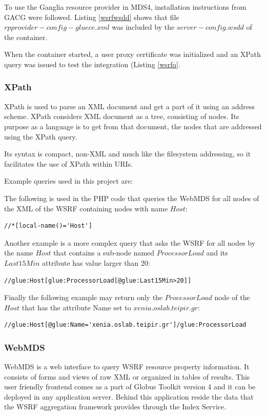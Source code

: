 To use the Ganglia resource provider in \ac{MDS}4, installation instructions from \ac{GACG} \cite{gacgrid} were followed. Listing \ref{wsrfwsdd} shows that file $rpprovider-config-gluece.xml$ was included by the $server-config.wsdd$ of the container.

When the container started, a user proxy certificate was initialized and an XPath query was issued to test the integration (Listing \ref{wsrfq}.
 
\subsubsection{XPath}

XPath is used to parse an XML document and get a part of it using an address scheme. XPath considers XML document as a tree, consisting of nodes. Its purpose as a language is to get from that document, the nodes that are addressed using the XPath query.

Its syntax is compact, non-XML and much like the filesystem addressing, so it facilitates the use of XPath within URIs.

Example queries used in this project are:

The following is used in the PHP code that queries the WebMDS for all nodes of the XML of the WSRF containing nodes with name $Host$:
\begin{lstlisting}
//*[local-name()='Host']
\end{lstlisting}

Another example is a more complex query that asks the WSRF for all nodes by the name $Host$ that contains a sub-node named $ProcessorLoad$ and its $Last15Min$ attribute has value larger than 20:
\begin{lstlisting}
//glue:Host[glue:ProcessorLoad[@glue:Last15Min>20]]
\end{lstlisting}

Finally the following example may return only the $ProcessorLoad$ node of the $Host$ that has the attribute Name set to $xenia.oslab.teipir.gr$:
\begin{lstlisting}
//glue:Host[@glue:Name='xenia.oslab.teipir.gr']/glue:ProcessorLoad
\end{lstlisting}


\subsubsection{WebMDS}

WebMDS is a web interface to query WSRF resource property information. It consists of forms and views of raw XML or organized in tables of results. This user friendly frontend comes as a part of Globus Toolkit version 4 and it can be deployed in any application server. Behind this application reside the data that the WSRF aggregation framework provides through the Index Service.

